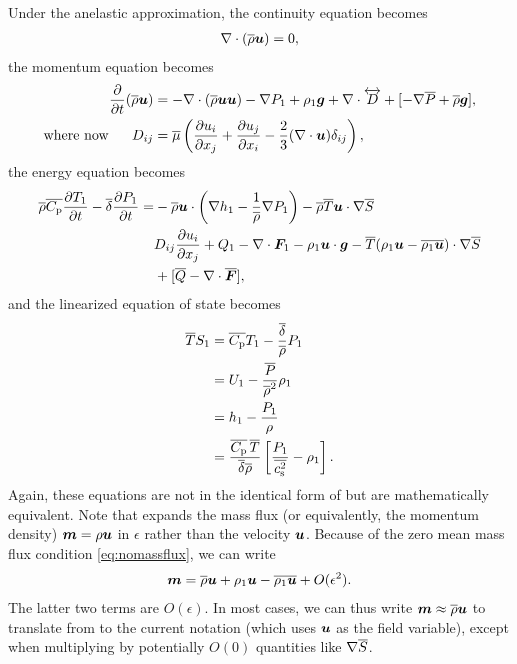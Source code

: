 \documentclass[12pt]{article}
\newcommand{\vecf}{\bm{F}}
\newcommand{\deltaref}{\overline{\delta}}
\newcommand{\cpref}{\overline{\cpcap}}
\newcommand{\cssqref}{\overline{\cs^2}}
\begin{document}
	Under the anelastic approximation, the continuity equation becomes
	\begin{align}\label{eq:ancont}
		\nabla\cdot(\overline{\rho}\bm{u})= 0,
	\end{align}
	the momentum equation becomes 
	\begin{subequations}\label{eq:anmom}
	\begin{align}
		\frac{\partial}{\partial t}(\overline{\rho}\bm{u})&=-\nabla\cdot(\overline{\rho}\bm{u}\bm{u}) - \nabla P_1 +\rho_1\bm{g} +\nabla\cdot \overleftrightarrow{D}+[-\nabla\overline{P} + \overline{\rho}\bm{g}],\label{eq:anmommain}\\
		\text{where now}\ \ \ \ \  D_{ij}& = \overline{\mu}\left(\frac{\partial u_i}{\partial x_j} + \frac{\partial u_j}{\partial x_i} - \frac{2}{3}(\nabla\cdot\bm{u})\delta_{ij}\right)\label{eq:anmomvisc},
	\end{align}
	\end{subequations}
	the energy equation becomes 
	\begin{align}\label{eq:anen}
		\rhoref\cpref\pderiv{T_1}{t} - \deltaref\pderiv{P_1}{t} = &-\rhoref\vecu\cdot\left(\nabla h_1-\frac{1}{\rhoref}\nabla P_1\right) - \rhoref \tmpref \ugrad \sref\nonumber\\
		& D_{ij}\pderiv{u_i}{x_j} + Q _1- \Div\vecf_1 -\rho_1\vecu\cdot\vecg - \tmpref(\rho_1\vecu-\overline{\rho_1\vecu})\cdot\nabla\sref\nonumber\\
		&+ [\qref - \Div\overline{\vecf}],
	\end{align}
  and the linearized equation of state becomes
  \begin{subequations}\label{eq:aneos}
  \begin{align}
  	\tmpref S_1 &= \cpref T_1 - \frac{\deltaref}{\rhoref} P_1\\
  	&= U_1 - \frac{\prsref}{\rhoref^2}\rho_1 \label{eq:linu}\\
  	&= h_1 - \frac{P_1}{\rho}\\
  	&= \frac{\cpref\, \tmpref}{\deltaref\rhoref}\left[\frac{P_1}{\cssqref}-\rho_1\right].
  \end{align}
  \end{subequations}
  Again, these equations are not in the identical form of \citet{Gough1969} but are mathematically equivalent. Note that \citet{Gough1969} expands the mass flux (or equivalently, the momentum density) $\bm{m}=\rho\bm{u}$ in $\epsilon$ rather than the velocity $\bm{u}$. Because of the zero mean mass flux condition \eqref{eq:nomassflux}, we can write
  \begin{align}
  	\bm{m} = \overline{\rho}\bm{u} + \rho_1\bm{u} - \overline{\rho_1\bm{u}} + O(\epsilon^2).
  \end{align}
  The latter two terms are $O(\epsilon)$. In most cases, we can thus write $\bm{m} \approx \overline{\rho} \bm{u}$ to translate from \citet{Gough1969} to the current notation (which uses $\bm{u}$ as the field variable), except when multiplying by potentially $O(0)$ quantities like $\nabla\overline{S}$. 
  
\end{document}
